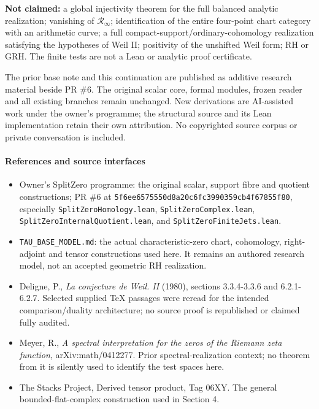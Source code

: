 \textbf{Not claimed:} a global injectivity theorem for the full balanced analytic realization;
vanishing of \(\mathcal R_\infty\); identification of the entire four-point chart category with an
arithmetic curve; a full compact-support/ordinary-cohomology realization satisfying the hypotheses
of Weil II; positivity of the unshifted Weil form; RH or GRH. The finite tests are not a Lean or
analytic proof certificate.

The prior base note and this continuation are published as additive research material beside PR \#6.
The original scalar core, formal modules, frozen reader and all existing branches remain unchanged.
New derivations are AI-assisted work under the owner's programme; the structural source and its Lean
implementation retain their own attribution. No copyrighted source corpus or private conversation is
included.

\paragraph{References and source interfaces}\label{pr_8:references-and-source-interfaces}

\begin{itemize}
\tightlist
\item
  Owner's SplitZero programme: the original scalar, support fibre and quotient constructions; PR \#6
  at \nolinkurl{5f6ee6575550d8a20c6fc3990359cb4f67855f80}, especially \nolinkurl{SplitZeroHomology.lean},
  \nolinkurl{SplitZeroComplex.lean}, \nolinkurl{SplitZeroInternalQuotient.lean}, and
  \nolinkurl{SplitZeroFiniteJets.lean}.
\item
  \nolinkurl{TAU_BASE_MODEL.md}: the actual characteristic-zero chart, cohomology, right-adjoint and
  tensor constructions used here. It remains an authored research model, not an accepted geometric
  RH realization.
\item
  Deligne, P., \emph{La conjecture de Weil. II} (1980), sections 3.3.4-3.3.6 and 6.2.1-6.2.7.
  Selected supplied TeX passages were reread for the intended comparison/duality architecture; no
  source proof is republished or claimed fully audited.
\item
  Meyer, R., \emph{A spectral interpretation for the zeros of the Riemann zeta function},
  arXiv:math/0412277. Prior spectral-realization context; no theorem from it is silently used to
  identify the test spaces here.
\item
  The Stacks Project, Derived tensor product, Tag 06XY. The general bounded-flat-complex
  construction used in Section 4.
\end{itemize}

